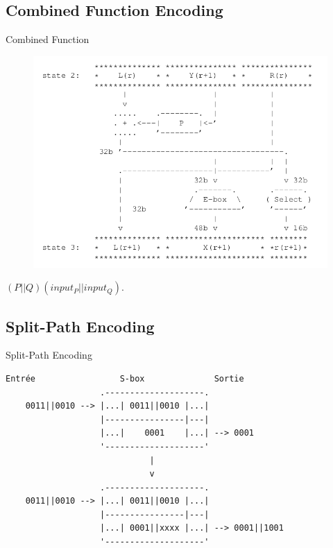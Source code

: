 \documentclass{beamer}
\begin{document}
\subsection{Combined Function Encoding}

\begin{frame}{Combined Function}
  \begin{figure}[h]
    \centering
    \includegraphics[scale=0.4]{./images/etape2.png}
  \end{figure}
  \begin{center}
    $(P||Q)(input_P||input_Q)$.
  \end{center}
\end{frame}

\subsection{Split-Path Encoding}

\begin{frame}[fragile]{Split-Path Encoding}
  \begin{Verbatim}[samepage=true]
    Entrée                 S-box              Sortie
                   .--------------------.
    0011||0010 --> |...| 0011||0010 |...|
                   |----------------|---|
                   |...|    0001    |...| --> 0001
                   '--------------------'
                             | 
                             v
                   .--------------------.
    0011||0010 --> |...| 0011||0010 |...|
                   |----------------|---|
                   |...| 0001||xxxx |...| --> 0001||1001
                   '--------------------'
  \end{Verbatim}
  
\end{frame}
\end{document}
